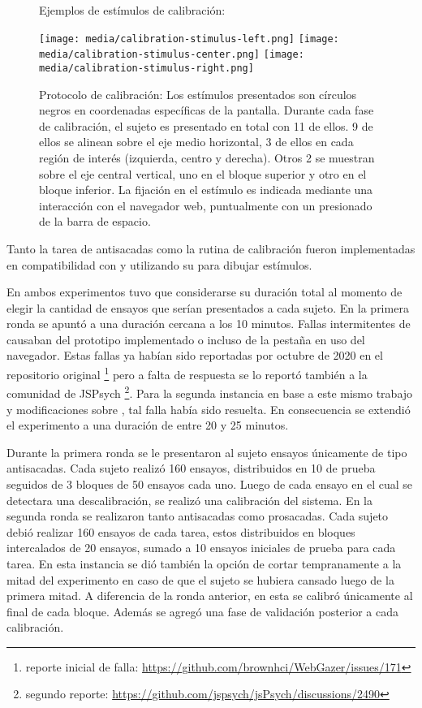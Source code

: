   \begin{figure}
    \centering

    Ejemplos de estímulos de calibración:

    \texttt{[image: media/calibration-stimulus-left.png]}
    \texttt{[image: media/calibration-stimulus-center.png]}
    \texttt{[image: media/calibration-stimulus-right.png]}

    \caption{Protocolo de calibración: Los estímulos presentados son círculos negros en coordenadas específicas de
    la pantalla.
    Durante cada fase de calibración, el sujeto es presentado en total con 11
    de ellos.
    9 de ellos se alinean sobre el eje medio horizontal, 3 de ellos en cada
    región de interés (izquierda, centro y derecha).
    Otros 2 se muestran sobre el eje central vertical, uno en el bloque
    superior y otro en el bloque inferior.
    La fijación en el estímulo es indicada mediante una interacción con el
    navegador web, puntualmente con un presionado de la barra de espacio.
}
    \label{fig:calibration-protocol}
  \end{figure}

  Tanto la tarea de antisacadas como la rutina de calibración fueron
  implementadas en compatibilidad con \jspsych y utilizando su \plugin
  \psychophysics para dibujar estímulos.

  En ambos experimentos tuvo que considerarse su duración total al momento de 
  elegir la cantidad de ensayos que serían presentados a cada sujeto.
  En la primera ronda se apuntó a una duración cercana a los 10 minutos.
  Fallas intermitentes de \webgazer causaban \crashes del prototipo implementado
  o incluso de la pestaña en uso del navegador.
  Estas fallas ya habían sido reportadas por octubre de 2020 en el repositorio
  original \footnote{reporte inicial de falla:
  \url{https://github.com/brownhci/WebGazer/issues/171}} pero a falta de
  respuesta se lo reportó también a la comunidad de JSPsych \footnote{segundo
  reporte: \url{https://github.com/jspsych/jsPsych/discussions/2490}}.
  Para la segunda instancia en base a este mismo trabajo y modificaciones sobre
  \webgazer, tal falla había sido resuelta.
  En consecuencia se extendió el experimento a una duración de entre 20 y 25 minutos.

  Durante la primera ronda se le presentaron al sujeto ensayos únicamente de tipo 
  antisacadas.
  Cada sujeto realizó 160 ensayos, distribuidos en 10 de prueba seguidos
  de 3 bloques de 50 ensayos cada uno.
  Luego de cada ensayo en el cual se detectara una descalibración, se realizó una calibración del sistema.
  En la segunda ronda se realizaron tanto antisacadas como prosacadas.
  Cada sujeto debió realizar 160 ensayos de cada tarea, estos distribuidos en
  bloques intercalados de 20 ensayos, sumado a 10 ensayos iniciales de prueba
  para cada tarea.
  En esta instancia se dió también la opción de cortar tempranamente a la mitad
  del experimento en caso de que el sujeto se hubiera cansado luego de la primera
  mitad.
  A diferencia de la ronda anterior, en esta se calibró únicamente al final de
  cada bloque.
  Además se agregó una fase de validación posterior a cada calibración.

